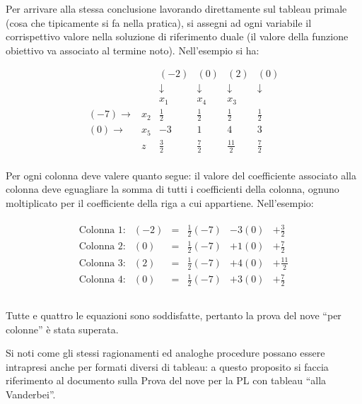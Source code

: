 \documentclass{article}
\begin{document}
	Per arrivare alla stessa conclusione lavorando direttamente sul tableau primale (cosa che tipicamente si fa nella pratica), si assegni ad ogni variabile il corrispettivo valore nella soluzione di riferimento duale (il valore della funzione obiettivo va associato al termine noto). Nell'esempio si ha:
	
  	\[
  	\begin{array}{rrrrrr}
  	& & (-2) & (0)  & (2) & (0) \\
  	&  & \downarrow \;& \downarrow \;& \downarrow \;& \downarrow \;\\
  	&  & x_1  & x_4 & x_3  \\
  	(-7) \rightarrow & x_2 &  \frac{1}{2} &  \frac{1}{2}  & \frac{1}{2}  &  \frac{1}{2} \\
  	(0) \rightarrow &   x_5 &  -3 &  1  &  4  &  3 \\
  	 & z  & \frac{3}{2} & \frac{7}{2} & \frac{11}{2}  & \frac{7}{2} \\
  	\end{array}
  	\]	   	
  	
  	Per ogni colonna deve valere quanto segue: il valore del coefficiente associato alla colonna deve eguagliare la somma di tutti i coefficienti della colonna, ognuno moltiplicato per il coefficiente della riga a cui appartiene. Nell'esempio:  	
  	
  	\[
  	\begin{array}{c}
  	\begin{array}{llcrrr}
  	\text{Colonna 1:} & (-2) &=& \frac{1}{2}(-7) & -3(0) & +\frac{3}{2} \\
  	\text{Colonna 2:} & (0) &=& \frac{1}{2}(-7) & +1(0) & +\frac{7}{2} \\
  	\text{Colonna 3:} & (2) &=& \frac{1}{2}(-7) & +4(0) & +\frac{11}{2} \\ 
  	\text{Colonna 4:} & (0) &=& \frac{1}{2}(-7) & +3(0) & +\frac{7}{2} \\
  	\end{array}\\		
  	\end{array}
  	\]  	
  	
  	Tutte e quattro le equazioni sono soddisfatte, pertanto la prova del nove ``per colonne'' è stata superata.
  	
  	Si noti come gli stessi ragionamenti ed analoghe procedure possano essere intrapresi anche per formati diversi di tableau: a questo proposito si faccia riferimento al documento sulla Prova del nove per la PL con tableau ``alla Vanderbei''.
\end{document}

